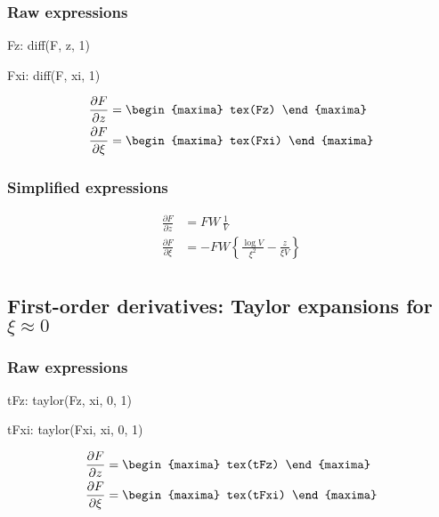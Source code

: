 \subsubsection*{Raw expressions}

\begin{maxima}
  Fz: diff(F, z, 1)
\end{maxima}%
\begin{maxima}
  Fxi: diff(F, xi, 1)
\end{maxima}%

{\color{MonVertF}
\begin{align*}
  \frac{\partial F}{\partial z}
  &=
    \begin{maxima}
       tex(Fz)
    \end{maxima} \\
  \frac{\partial F}{\partial \xi}
  &=
    \begin{maxima}
       tex(Fxi)
    \end{maxima} \\
\end{align*}
}
\subsubsection*{Simplified  expressions}
{\color{red}
\begin{align*}
  \frac{\partial F}{\partial z}
  &= F W \, \frac{1}{V} \\
  \frac{\partial F}{\partial \xi}
  &= - F W  \left\{ \frac{\log V}{\xi^2} - \frac{z}{\xi V} \right\}\\
\end{align*}
}



\subsection{First-order derivatives: Taylor expansions for $\xi \approx 0$}

\subsubsection*{Raw  expressions}

\begin{maxima}
  tFz: taylor(Fz, xi, 0, 1)
\end{maxima}%
\begin{maxima}
  tFxi: taylor(Fxi, xi, 0, 1)
\end{maxima}%
{\color{MonVertF}
\begin{align*}
  \frac{\partial F}{\partial z}
  &=
    \begin{maxima}
       tex(tFz)
    \end{maxima} \\
  \frac{\partial F}{\partial \xi}
  &=
    \begin{maxima}
       tex(tFxi)
    \end{maxima} \\
\end{align*}}

